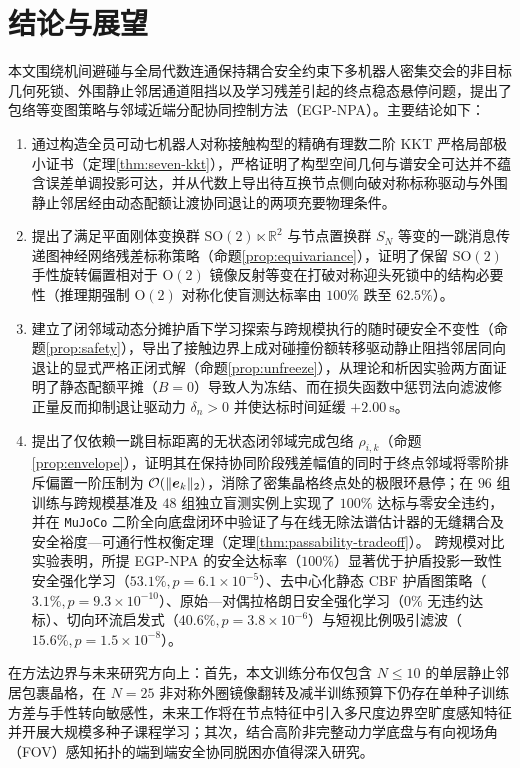 \section{结论与展望}\label{sec:conclusion}

本文围绕机间避碰与全局代数连通保持耦合安全约束下多机器人密集交会的非目标几何死锁、外围静止邻居通道阻挡以及学习残差引起的终点稳态悬停问题，提出了包络等变图策略与邻域近端分配协同控制方法（EGP-NPA）。主要结论如下：
\begin{enumerate}
 \item 通过构造全员可动七机器人对称接触构型的精确有理数二阶 KKT 严格局部极小证书（定理\ref{thm:seven-kkt}），严格证明了构型空间几何与谱安全可达并不蕴含误差单调投影可达，并从代数上导出待互换节点侧向破对称标称驱动与外围静止邻居经由动态配额让渡协同退让的两项充要物理条件。
 \item 提出了满足平面刚体变换群 $\mathrm{SO}(2)\ltimes\mathbb R^2$ 与节点置换群 $S_N$ 等变的一跳消息传递图神经网络残差标称策略（命题\ref{prop:equivariance}），证明了保留 $\mathrm{SO}(2)$ 手性旋转偏置相对于 $\mathrm{O}(2)$ 镜像反射等变在打破对称迎头死锁中的结构必要性（推理期强制 $\mathrm{O}(2)$ 对称化使盲测达标率由 $100\%$ 跌至 $62.5\%$）。
 \item 建立了闭邻域动态分摊护盾下学习探索与跨规模执行的随时硬安全不变性（命题\ref{prop:safety}），导出了接触边界上成对碰撞份额转移驱动静止阻挡邻居同向退让的显式严格正闭式解（命题\ref{prop:unfreeze}），从理论和析因实验两方面证明了静态配额平摊（$B=0$）导致人为冻结、而在损失函数中惩罚法向滤波修正量反而抑制退让驱动力 $\delta_n>0$ 并使达标时间延缓 $+2.00\ \mathrm s$。
 \item 提出了仅依赖一跳目标距离的无状态闭邻域完成包络 $\rho_{i,k}$（命题\ref{prop:envelope}），证明其在保持协同阶段残差幅值的同时于终点邻域将零阶排斥偏置一阶压制为 $\mathcal O(\lVert\boldsymbol{e}_k\rVert_2)$，消除了密集晶格终点处的极限环悬停；在 $96$ 组训练与跨规模基准及 $48$ 组独立盲测实例上实现了 $100\%$ 达标与零安全违约，并在 \texttt{MuJoCo} 二阶全向底盘闭环中验证了与在线无除法谱估计器的无缝耦合及安全裕度—可通行性权衡定理（定理\ref{thm:passability-tradeoff}）。
 跨规模对比实验表明，所提 EGP-NPA 的安全达标率（$100\%$）显著优于护盾投影一致性安全强化学习（$53.1\%,p=6.1\times 10^{-5}$）、去中心化静态 CBF 护盾图策略（$3.1\%,p=9.3\times 10^{-10}$）、原始—对偶拉格朗日安全强化学习（$0\%$ 无违约达标）、切向环流启发式（$40.6\%,p=3.8\times 10^{-6}$）与短视比例吸引滤波（$15.6\%,p=1.5\times 10^{-8}$）。
\end{enumerate}

在方法边界与未来研究方向上：首先，本文训练分布仅包含 $N\le 10$ 的单层静止邻居包裹晶格，在 $N=25$ 非对称外圈镜像翻转及减半训练预算下仍存在单种子训练方差与手性转向敏感性，未来工作将在节点特征中引入多尺度边界空旷度感知特征并开展大规模多种子课程学习；其次，结合高阶非完整动力学底盘与有向视场角（FOV）感知拓扑的端到端安全协同脱困亦值得深入研究。
